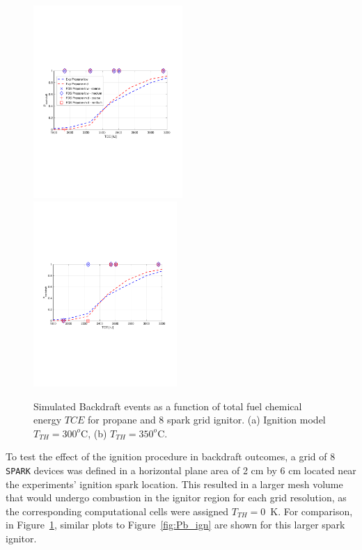 \documentclass[12pt,letterpaper]{article}
\begin{document}
\begin{flushleft}
%
\begin{figure}[h]
    \centering
    \includegraphics[trim = 14.5mm 85mm 17mm 80mm, clip,width=0.505\textwidth]{IAFSS_Paper/Figures/PbvsTCE_Cign_LES_Extinction_2_TTH300_LGIGN_Propaneb.pdf}
    \includegraphics[trim = 22mm 85mm 17mm 80mm, clip,width=0.485\textwidth]{IAFSS_Paper/Figures/PbvsTCE_Cign_LES_Extinction_2_TTH350_LGIGN_Propaneb.pdf}
     \\
    \caption{Simulated Backdraft events as a function of total fuel chemical energy $TCE$ for propane and 8 spark grid ignitor. (a) Ignition model $T_{TH}=300^o$C, (b) $T_{TH}=350^o$C. }
    \label{fig:Pb_ignproc}
\end{figure}
%
To test the effect of the ignition procedure in backdraft outcomes, a grid of 8 \texttt{SPARK} devices was defined in a horizontal plane area of 2 cm by 6 cm located near the experiments' ignition spark location. This resulted in a larger mesh volume that would undergo combustion in the ignitor region for each grid resolution, as the corresponding computational cells were assigned $T_{TH}=0$~K. For comparison, in Figure~\ref{fig:Pb_ignproc}, similar plots to Figure~\ref{fig:Pb_ign} are shown for this larger spark ignitor.


\end{flushleft}
\end{document}
